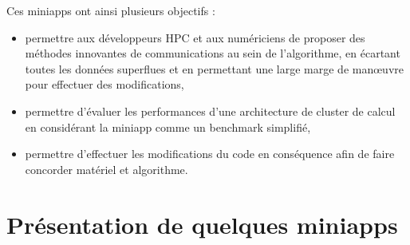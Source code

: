 \documentclass[11pt,a4paper,oneside]{memoir}
\theoremstyle{definition}
\theoremstyle{remark}
\theoremstyle{plain}
\begin{document}
Ces miniapps ont ainsi plusieurs objectifs :
\begin{itemize}
\item permettre aux développeurs HPC et aux numériciens de proposer des méthodes innovantes de communications au sein de l'algorithme, en écartant toutes les données superflues et en permettant une large marge de manœuvre pour effectuer des modifications,
\item permettre d'évaluer les performances d'une architecture de cluster de calcul en considérant la miniapp comme un benchmark simplifié,
\item permettre d'effectuer les modifications du code en conséquence afin de faire concorder matériel et algorithme.
\end{itemize}\bigskip



\section{Présentation de quelques miniapps}
\end{document}
